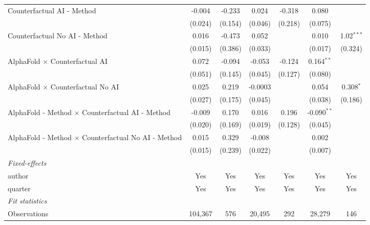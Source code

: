 \begin{tabular}{lcccccc}
   Counterfactual AI - Method                                 & -0.004  & -0.233  & 0.024   & -0.318  & 0.080         &   \\   
                                                              & (0.024) & (0.154) & (0.046) & (0.218) & (0.075)       &   \\   
   Counterfactual No AI - Method                              & 0.016   & -0.473  & 0.052   &         & 0.010         & 1.02$^{***}$\\   
                                                              & (0.015) & (0.386) & (0.033) &         & (0.017)       & (0.324)\\   
   AlphaFold $\times$ Counterfactual AI                       & 0.072   & -0.094  & -0.053  & -0.124  & 0.164$^{**}$  &   \\   
                                                              & (0.051) & (0.145) & (0.045) & (0.127) & (0.080)       &   \\   
   AlphaFold $\times$ Counterfactual No AI                    & 0.025   & 0.219   & -0.0003 &         & 0.054         & 0.308$^{*}$\\   
                                                              & (0.027) & (0.175) & (0.045) &         & (0.038)       & (0.186)\\   
   AlphaFold - Method $\times$ Counterfactual AI - Method     & -0.009  & 0.170   & 0.016   & 0.196   & -0.090$^{**}$ &   \\   
                                                              & (0.020) & (0.169) & (0.019) & (0.128) & (0.045)       &   \\   
   AlphaFold - Method $\times$ Counterfactual No AI - Method  & 0.015   & 0.329   & -0.008  &         & 0.002         &   \\   
                                                              & (0.015) & (0.239) & (0.022) &         & (0.007)       &   \\   
   \midrule
   \emph{Fixed-effects}\\
   author                                                     & Yes     & Yes     & Yes     & Yes     & Yes           & Yes\\  
   quarter                                                    & Yes     & Yes     & Yes     & Yes     & Yes           & Yes\\  
   \midrule
   \emph{Fit statistics}\\
   Observations                                               & 104,367 & 576     & 20,495  & 292     & 28,279        & 146\\  

\end{tabular}
